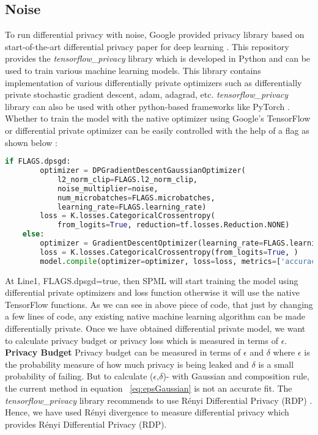 \subsection{Noise}
\label{sec:implementationNoise}
To run differential privacy with noise, Google provided privacy library \cite{11} based on start-of-the-art differential privacy paper for deep learning \cite{4}. This repository provides the \textit{tensorflow\_privacy} library which is developed in Python and can be used to train various machine learning models. This library contains implementation of various differentially private optimizers such as differentially private stochastic gradient descent, adam, adagrad, etc. \textit{tensorflow\_privacy} library can also be used with other python-based frameworks like PyTorch \cite{75}. Whether to train the model with the native optimizer using Google's TensorFlow or differential private optimizer can be easily controlled with the help of a flag as shown below :
\linebreak
\begin{lstlisting}[language=Python]
    if FLAGS.dpsgd:
        optimizer = DPGradientDescentGaussianOptimizer(
            l2_norm_clip=FLAGS.l2_norm_clip,
            noise_multiplier=noise,
            num_microbatches=FLAGS.microbatches,
            learning_rate=FLAGS.learning_rate)
        loss = K.losses.CategoricalCrossentropy(
            from_logits=True, reduction=tf.losses.Reduction.NONE)
    else:
        optimizer = GradientDescentOptimizer(learning_rate=FLAGS.learning_rate)
        loss = K.losses.CategoricalCrossentropy(from_logits=True, )
        model.compile(optimizer=optimizer, loss=loss, metrics=['accuracy'])
\end{lstlisting}
At Line1, FLAGS.dpsgd=true, then SPML will start training the model using differential private optimizers and loss function otherwise it will use the native TensorFlow functions. As we can see in above piece of code, that just by changing a few lines of code, any existing native machine learning algorithm can be made differentially private. Once we have obtained differential private model, we want to calculate privacy budget or privacy loss which is measured in terms of $\epsilon$.\newline
\newline
\textbf{Privacy Budget}
Privacy budget can be measured in terms of $\epsilon$ and $\delta$ where $\epsilon$ is the probability measure of how much privacy is being leaked and $\delta$ is a small probability of failing. But to calculate ($\epsilon$,$\delta$)- with Gaussian and composition rule, the current method in equation ~\ref{eq:epsGaussian} is not an accurate fit. The \textit{tensorflow\_privacy} library recommends to use Rényi Differential Privacy (RDP) \cite{23}. Hence, we have used Rényi divergence to measure differential privacy which provides Rényi Differential Privacy (RDP). 

